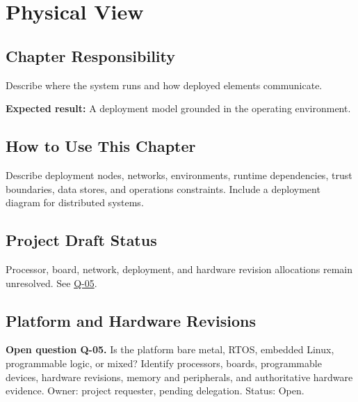 \chapter{Physical View}
\section{Chapter Responsibility}
\label{Section:PhysicalViewResponsibility}
Describe where the system runs and how deployed elements communicate.

\noindent\textbf{Expected result:} A deployment model grounded in the operating environment.

\section{How to Use This Chapter}
Describe deployment nodes, networks, environments, runtime dependencies, trust boundaries, data stores, and operations constraints. Include a deployment diagram for distributed systems.
\section{Project Draft Status}
Processor, board, network, deployment, and hardware revision allocations remain unresolved. See \hyperref[Question:Q-05]{Q-05}.
\section{Platform and Hardware Revisions}
\label{Question:Q-05}
\par\noindent\textbf{Open question Q-05.} Is the platform bare metal, RTOS, embedded Linux, programmable logic, or mixed? Identify processors, boards, programmable devices, hardware revisions, memory and peripherals, and authoritative hardware evidence. Owner: project requester, pending delegation. Status: Open.
